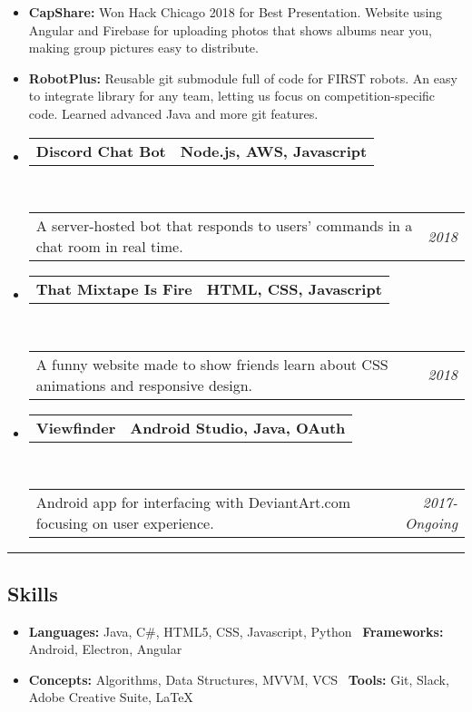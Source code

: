 \documentclass[11pt,letterpaper]{article}
\makeatletter
\newcommand{\headerrow}[2]
{\begin{tabular*}{\linewidth}{l@{\extracolsep{\fill}}r}
	#1 &
	#2 \\
\end{tabular*}}
\makeatother
\begin{document}
\begin{itemize}
	\parskip=0.1em
	
	\item \textbf{CapShare:}
		Won Hack Chicago 2018 for Best Presentation. Website using Angular and Firebase for uploading photos that shows albums near you, making group pictures easy to distribute. 
		
	\item \textbf{RobotPlus:}
		Reusable git submodule full of code for FIRST robots. An easy to integrate library for any team, letting us focus on competition-specific code. Learned advanced Java and more git features. 
		
	\item 
	\headerrow
		{\textbf{Discord Chat Bot}}
		{\textbf{Node.js, AWS, Javascript}}
	\\
	\headerrow
		{A server-hosted bot that responds to users' commands in a chat room in real time.}
		{\emph{2018}}
		
	\item 
	\headerrow
		{\textbf{That Mixtape Is Fire}}
		{\textbf{HTML, CSS, Javascript}}
	\\
	\headerrow
		{A funny website made to show friends learn about CSS animations and responsive design.}
		{\emph{2018}}
	
	\item 
	\headerrow
		{\textbf{Viewfinder}}
		{\textbf{Android Studio, Java, OAuth}}
	\\
	\headerrow
		{Android app for interfacing with DeviantArt.com focusing on user experience.}
		{\emph{2017-Ongoing}}

\end{itemize}

\hrule
\vspace{-0.4em}
\subsection*{Skills}

\begin{itemize}
	\parskip=0em

	\item \textbf{Languages:} Java, C\#, HTML5, CSS, Javascript, Python \textbullet \ 
		\textbf{Frameworks:} Android, Electron, Angular %
	\item \textbf{Concepts:} Algorithms, Data Structures, MVVM, VCS \textbullet \ 
		\textbf{Tools:} Git, Slack, Adobe Creative Suite, \LaTeX
	
\end{itemize}
\end{document}
